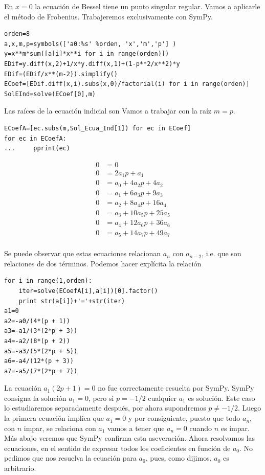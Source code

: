 En $x=0$ la ecuación de Bessel tiene un punto  singular regular. Vamos a aplicarle el método de Frobenius. Trabajeremos exclusivamente con SymPy.

\begin{lstlisting}
orden=8
a,x,m,p=symbols(['a0:%s' %orden, 'x','m','p'] )
y=x**m*sum([a[i]*x**i for i in range(orden)])
EDif=y.diff(x,2)+1/x*y.diff(x,1)+(1-p**2/x**2)*y
EDif=(EDif/x**(m-2)).simplify()
ECoef=[EDif.diff(x,i).subs(x,0)/factorial(i) for i in range(orden)]
SolEInd=solve(ECoef[0],m)
\end{lstlisting}

Las raíces de la ecuación indicial son
Vamos a trabajar con la raíz $m=p$.

\begin{lstlisting}
ECoefA=[ec.subs(m,Sol_Ecua_Ind[1]) for ec in ECoef]
for ec in ECoefA:
...     pprint(ec)

\end{lstlisting}

\[
\begin{split}
 0 & = 0\\
0&=2 a_{1} p + a_{1}\\
0&=a_{0} + 4 a_{2} p + 4 a_{2}\\
0&=a_{1} + 6 a_{3} p + 9 a_{3}\\
0&=a_{2} + 8 a_{4} p + 16 a_{4}\\
0&=a_{3} + 10 a_{5} p + 25 a_{5}\\
0&=a_{4} + 12 a_{6} p + 36 a_{6}\\
0&=a_{5} + 14 a_{7} p + 49 a_{7}\\
\end{split}
\]



Se puede observar que estas ecuaciones relacionan  $a_n$ con $a_{n-2}$, i.e. que son relaciones de dos términos.  Podemos hacer explícita la relación

\begin{lstlisting}
for i in range(1,orden):
    iter=solve(ECoefA[i],a[i])[0].factor()
    print str(a[i])+'='+str(iter)
a1=0
a2=-a0/(4*(p + 1))
a3=-a1/(3*(2*p + 3))
a4=-a2/(8*(p + 2))
a5=-a3/(5*(2*p + 5))
a6=-a4/(12*(p + 3))
a7=-a5/(7*(2*p + 7))
\end{lstlisting}

 La ecuación $a_1(2p+1)=0$ no fue correctamente resuelta por SymPy. SymPy consigna la solución $a_1=0$, pero si  $p=-1/2$ cualquier $a_1$ es solución. Este caso lo estudiaremos separadamente después, por ahora supondremos $p\neq -1/2$. Luego la primera ecuación implica que $a_1=0$ y por consiguiente, puesto que todo $a_n$, con $n$ impar, se relaciona con $a_1$ vamos a tener que $a_n=0$ cuando $n$ es impar. Más abajo veremos que SymPy confirma esta aseveración. Ahora resolvamos las ecuaciones, en el sentido de expresar todos los coeficientes en función de $a_0$. No pedimos que nos resuelva la ecuación para $a_0$, pues, como dijimos, $a_0$ es arbitrario.


